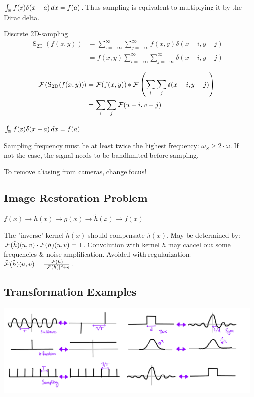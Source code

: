 \begin{definition}
  \(\int_{\operatorname{\mathbb{R}}}f(x)\delta(x - a) \,dx = f(a)\). Thus sampling is equivalent to multiplying it by the Dirac delta.
\end{definition}

\begin{definition}
  Discrete 2D-sampling
  \[\begin{aligned} \operatorname{S}_{2 \mathrm{D}}(f(x, y)) & =\sum_{i=-\infty}^{\infty} \sum_{j=-\infty}^{\infty} f(x, y) \delta(x-i, y-j) \\ & =f(x, y) \sum_{i=-\infty}^{\infty} \sum_{j=-\infty}^{\infty} \delta(x-i, y-j)\end{aligned}\]
\end{definition}

\begin{definition}
  \begin{align*}
    \operatorname{\mathcal{F}}\left(\operatorname{S}_{2 \mathrm{D}}(f(x, y))\right) & = \operatorname{\mathcal{F}}(f(x, y)) \ast \operatorname{\mathcal{F}}\left(\sum_{i} \sum_{j} \delta(x-i, y-j)\right) \\
    & = \sum_i \sum_j \operatorname{\mathcal{F}}(u - i, v - j)
  \end{align*}
\end{definition}

\begin{definition}
  \(\int_{\operatorname{\mathbb{R}}} f(x) \delta(x - a) \, dx = f(a)\)
\end{definition}

\pagebreak
\begin{algorithm}
  Sampling frequency must be at least twice the highest frequency: \(\omega_S \geq 2 \cdot \omega\). If not the case, the signal needs to be bandlimited before sampling.
\end{algorithm}

\begin{theorem}
  To remove aliasing from cameras, change focus!
\end{theorem}

\subsection{Image Restoration Problem}
\begin{center}
  \(f(x) \to h(x) \to g(x) \to \tilde{h}(x) \to f(x)\)
\end{center}
The "inverse" kernel \(\tilde{h}(x)\) should compensate \(h(x)\). May be determined by: \(\operatorname{\mathcal{F}}(\tilde{h})(u, v) \cdot \operatorname{\mathcal{F}}(h)(u, v) = 1\). Convolution with kernel \(h\) may cancel out some frequencies \& noise amplification. Avoided with regularization: \(\tilde{\operatorname{\mathcal{F}}}(\tilde{h})(u, v) = \frac{\operatorname{\mathcal{F}}(h)}{|\operatorname{\mathcal{F}}(h)|^2 + \epsilon}\).

\subsection{Transformation Examples}
\includegraphics*[width=\linewidth]{assets/fourier-functions.png}
